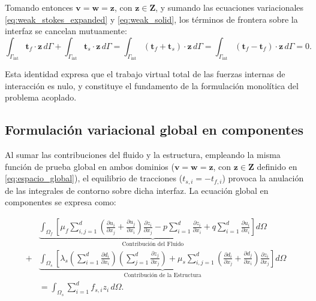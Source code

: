 \documentclass[12pt, letterpaper]{report}
\theoremstyle{definition}
\begin{document}
Tomando entonces $\mathbf{v} = \mathbf{w} = \mathbf{z}$, con $\mathbf{z} \in \mathbf{Z}$, y sumando las ecuaciones variacionales \eqref{eq:weak_stokes_expanded} y \eqref{eq:weak_solid}, los términos de frontera sobre la interfaz se cancelan mutuamente:
\[
\int_{\Gamma_{\text{int}}} \mathbf{t}_f \cdot \mathbf{z} \, d\Gamma + \int_{\Gamma_{\text{int}}} \mathbf{t}_s \cdot \mathbf{z} \, d\Gamma
= \int_{\Gamma_{\text{int}}} \left( \mathbf{t}_f + \mathbf{t}_s \right) \cdot \mathbf{z} \, d\Gamma
= \int_{\Gamma_{\text{int}}} \left( \mathbf{t}_f - \mathbf{t}_f \right) \cdot \mathbf{z} \, d\Gamma = 0.
\]

Esta identidad expresa que el trabajo virtual total de las fuerzas internas de interacción es nulo, y constituye el fundamento de la formulación monolítica del problema acoplado.

\subsection{Formulación variacional global en componentes}

Al sumar las contribuciones del fluido y la estructura, empleando la misma función de prueba global en ambos dominios ($\mathbf{v} = \mathbf{w} = \mathbf{z}$, con $\mathbf{z} \in \mathbf{Z}$ definido en \eqref{eq:espacio_global}), el equilibrio de tracciones ($t_{s,i} = -t_{f,i}$) provoca la anulación de las integrales de contorno sobre dicha interfaz. La ecuación global en componentes se expresa como:

\begin{equation} \label{eq:global_weak_components}
\begin{split}
    &\underbrace{\int_{\Omega_f} \left[ \mu_f \sum_{i,j=1}^d \left( \frac{\partial u_i}{\partial x_j} + \frac{\partial u_j}{\partial x_i} \right) \frac{\partial z_i}{\partial x_j} - p \sum_{i=1}^d \frac{\partial z_i}{\partial x_i} + q \sum_{i=1}^d \frac{\partial u_i}{\partial x_i} \right] d\Omega}_{\text{Contribución del Fluido}} \\
    + &\underbrace{\int_{\Omega_s} \left[ \lambda_s \left( \sum_{i=1}^d \frac{\partial d_i}{\partial x_i} \right) \left( \sum_{j=1}^d \frac{\partial z_j}{\partial x_j} \right) + \mu_s \sum_{i,j=1}^d \left( \frac{\partial d_i}{\partial x_j} + \frac{\partial d_j}{\partial x_i} \right) \frac{\partial z_i}{\partial x_j} \right] d\Omega}_{\text{Contribución de la Estructura}} \\
    &= \int_{\Omega_s} \sum_{i=1}^d f_{s,i} z_i \, d\Omega.
\end{split}
\end{equation}
\end{document}

